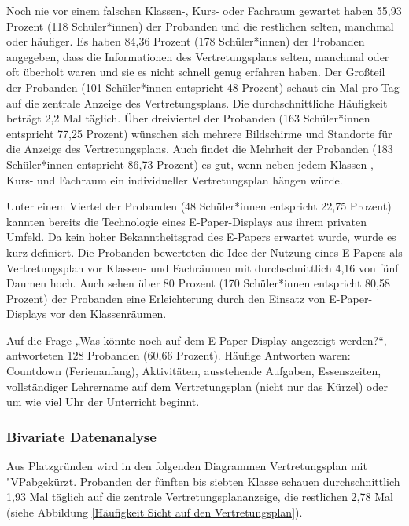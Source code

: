 \documentclass[10pt]{article}
\begin{document}
Noch nie vor einem falschen Klassen-, Kurs- oder Fachraum gewartet haben 55,93 Prozent (118 Schüler*innen) der Probanden und die restlichen selten, manchmal oder häufiger.
Es haben 84,36 Prozent (178 Schüler*innen) der Probanden angegeben, dass die Informationen des Vertretungsplans selten, manchmal oder oft überholt waren und sie es nicht schnell genug erfahren haben. 
Der Großteil der Probanden (101 Schüler*innen entspricht 48 Prozent) schaut ein Mal pro Tag auf die zentrale Anzeige des Vertretungsplans. Die durchschnittliche Häufigkeit beträgt 2,2 Mal täglich. 
Über dreiviertel der Probanden (163 Schüler*innen entspricht 77,25 Prozent) wünschen sich mehrere Bildschirme und Standorte für die Anzeige des Vertretungsplans. Auch findet die Mehrheit der Probanden (183 Schüler*innen entspricht 86,73 Prozent) es gut, wenn neben jedem Klassen-, Kurs- und Fachraum ein individueller Vertretungsplan hängen würde.

Unter einem Viertel der Probanden (48 Schüler*innen entspricht 22,75 Prozent) kannten bereits die Technologie eines E-Paper-Displays aus ihrem privaten Umfeld. Da kein hoher Bekanntheitsgrad des E-Papers erwartet wurde, wurde es kurz definiert.
Die Probanden bewerteten die Idee der Nutzung eines E-Papers als Vertretungsplan vor Klassen- und Fachräumen mit durchschnittlich 4,16 von fünf Daumen hoch.
Auch sehen über 80 Prozent (170 Schüler*innen entspricht 80,58 Prozent) der Probanden eine Erleichterung durch den Einsatz von E-Paper-Displays vor den Klassenräumen. 

Auf die Frage „Was könnte noch auf dem E-Paper-Display angezeigt werden?“, antworteten 128 Probanden (60,66 Prozent). Häufige Antworten waren: Countdown (Ferienanfang), Aktivitäten, ausstehende Aufgaben, Essenszeiten, vollständiger Lehrername auf dem Vertretungsplan (nicht nur das Kürzel) oder um wie viel Uhr der Unterricht beginnt.

\subsubsection{Bivariate Datenanalyse}
Aus Platzgründen wird in den folgenden Diagrammen Vertretungsplan mit "VP\grqq abgekürzt. \newline
Probanden der fünften bis siebten Klasse schauen durchschnittlich 1,93 Mal täglich auf die zentrale Vertretungsplananzeige, die restlichen 2,78 Mal (siehe Abbildung \ref{Häufigkeit Sicht auf den Vertretungsplan}).
\end{document}
